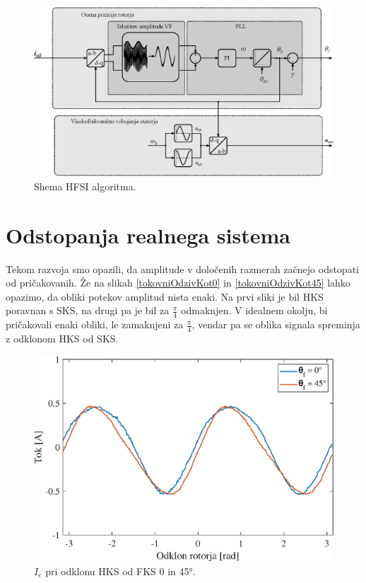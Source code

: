 \documentclass[a4paper,twoside,openright,12pt,slovene]{book}
\begin{document}
\begin{figure}[!htbp]
    \centering
    \includegraphics[width=0.9\columnwidth]{Slike/Inkscape/HFSIsimple.eps}
    \caption{\label{HFSIsimple} Shema HFSI algoritma.}
\end{figure}
\newpage
\section{Odstopanja realnega sistema}

Tekom razvoja smo opazili, da amplitude v določenih razmerah začnejo odstopati od pričakovanih. Že na slikah \ref{tokovniOdzivKot0} in \ref{tokovniOdzivKot45} lahko opazimo, da obliki potekov amplitud
nista enaki. Na prvi sliki je bil HKS poravnan s SKS, na drugi pa je bil za $\frac{\pi}{4}$ odmaknjen. V idealnem okolju, bi pričakovali enaki obliki, le zamaknjeni za $\frac{\pi}{4}$, vendar pa se
oblika signala spreminja z odklonom HKS od SKS. 

\begin{figure}[!htbp]
    \centering
    \includegraphics[width=0.88\columnwidth]{Slike/reguliranaVelicinaIdq0in45.eps}
    \caption{\label{reguliranaVelicinaIdq0in45} $I_e$ pri odklonu HKS od FKS 0 in 45°.}
\end{figure}
\end{document}
